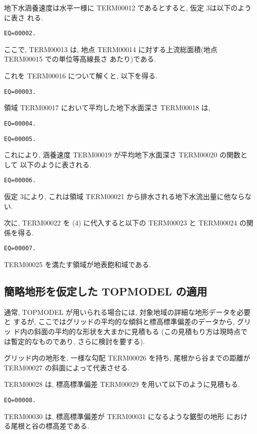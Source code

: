 地下水涵養速度は水平一様に TERM00012 であるとすると, 仮定 3は以下のように表さ
れる.
\begin{verbatim}
EQ=00002.
\end{verbatim}
ここで, TERM00013 は, 地点 TERM00014 に対する上流総面積(地点 TERM00015 での単位等高線長さ
あたり)である.

これを TERM00016 について解くと, 以下を得る.
\begin{verbatim}
EQ=00003.
\end{verbatim}

領域 TERM00017 において平均した地下水面深さ TERM00018 は,
\begin{verbatim}
EQ=00004.
\end{verbatim}
\begin{verbatim}
EQ=00005.
\end{verbatim}

これにより, 涵養速度 TERM00019 が平均地下水面深さ TERM00020 の関数として
以下のように表される.
\begin{verbatim}
EQ=00006.
\end{verbatim}
仮定 3により, これは領域 TERM00021 から排水される地下水流出量に他ならない.

次に, TERM00022 を (4) に代入すると以下の TERM00023 と TERM00024
の関係を得る.
\begin{verbatim}
EQ=00007.
\end{verbatim}

TERM00025 を満たす領域が地表飽和域である.

\subsection{簡略地形を仮定した TOPMODEL の適用}

通常, TOPMODEL が用いられる場合には, 対象地域の詳細な地形データを必要と
するが, ここではグリッドの平均的な傾斜と標高標準偏差のデータから, グリッ
ド内の斜面の平均的な形状を大まかに見積もる
(この見積もり方は現時点では暫定的なものであり, さらに検討を要する).

グリッド内の地形を, 一様な勾配 TERM00026 を持ち, 尾根から谷までの距離が
TERM00027 の斜面によって代表させる.

TERM00028 は, 標高標準偏差 TERM00029 を用いて以下のように見積もる.
\begin{verbatim}
EQ=00008.
\end{verbatim}
TERM00030 は, 標高標準偏差が TERM00031 になるような鋸型の地形
における尾根と谷の標高差である.

